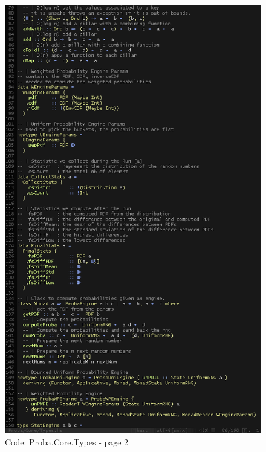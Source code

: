 \documentclass[12pt,a4paper,titlepage]{article}
\begin{document}
\begin{figure}[h!]
\centering
\includegraphics[width=1\textwidth]{img/code-types-2.png}
\caption{Code: Proba.Core.Types - page 2}
\label{fig:core.types2}
\end{figure}
\end{document}
